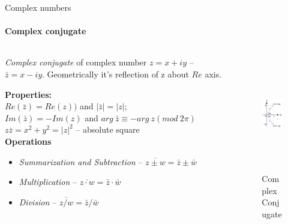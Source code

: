 \documentclass[aspectratio=169]{beamer}
\begin{document}
\begin{frame}[t]{Complex numbers}
    \framesubtitle{Complex conjugate}
    \vspace{-0.3cm}
    \begin{columns}[T,onlytextwidth]
        \begin{column}{0.7\textwidth}
            \textit{Complex conjugate} of complex number $z = x+ iy$ -- ${\bar  z}=x-iy$. Geometrically it's reflection of z about $Re$ axis.

            \textbf{Properties:}\\
            $Re(\bar{z}) = Re(z))$ and $|\bar{z}| = |z|$; \\
            $Im(\bar{z}) = -Im(z)$ and $arg\ \bar{z}\equiv -arg\ z (mod\ 2\pi)$ \\
            $z\bar{z} = x^2 + y^2 = |z|^2$ -- absolute square \\
            \textbf{Operations}
            \begin{itemize}
                \item  \textit{Summarization and Subtraction} -- ${\overline {z\pm w}}={\bar {z}}\pm {\bar {w}}$
                \item \textit{Multiplication} -- ${\overline {z\cdot w}}={\bar {z}}\cdot {\bar {w}}$
                \item \textit{Division} -- ${\overline {z/w}}={\bar {z}}/{\bar {w}}$
            \end{itemize}

        \end{column}
        \begin{column}{0.29\textwidth}
            \vspace{-0.5cm}
            \begin{figure}[H]
                \centering\includegraphics[height=5cm,width=1\textwidth,keepaspectratio]{conjugate.png}
                \caption*{Complex Conjugate}
                \label{fig:conjugate.png}
            \end{figure}
        \end{column}
    \end{columns}
\end{frame}
\end{document}
